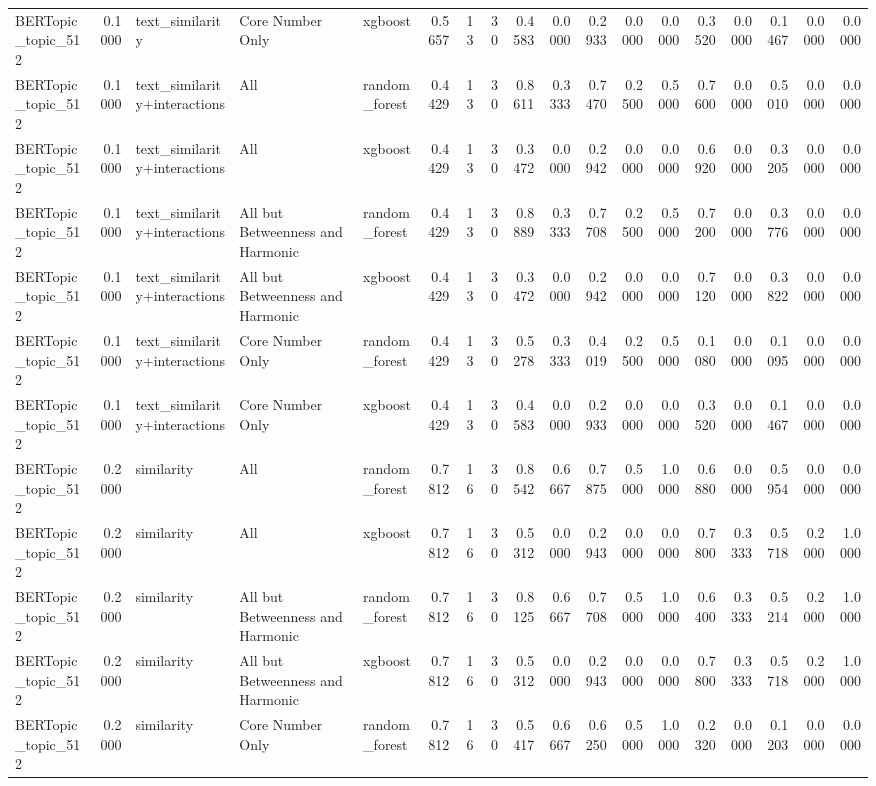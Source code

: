 \begin{tabular}{lrlllrrrrrrrrrrrrr}
BERTopic_topic_512 & 0.1000 & text_similarity & Core Number Only & xgboost & 0.5657 & 13 & 30 & 0.4583 & 0.0000 & 0.2933 & 0.0000 & 0.0000 & 0.3520 & 0.0000 & 0.1467 & 0.0000 & 0.0000 \\
BERTopic_topic_512 & 0.1000 & text_similarity+interactions & All & random_forest & 0.4429 & 13 & 30 & 0.8611 & 0.3333 & 0.7470 & 0.2500 & 0.5000 & 0.7600 & 0.0000 & 0.5010 & 0.0000 & 0.0000 \\
BERTopic_topic_512 & 0.1000 & text_similarity+interactions & All & xgboost & 0.4429 & 13 & 30 & 0.3472 & 0.0000 & 0.2942 & 0.0000 & 0.0000 & 0.6920 & 0.0000 & 0.3205 & 0.0000 & 0.0000 \\
BERTopic_topic_512 & 0.1000 & text_similarity+interactions & All but Betweenness and Harmonic & random_forest & 0.4429 & 13 & 30 & 0.8889 & 0.3333 & 0.7708 & 0.2500 & 0.5000 & 0.7200 & 0.0000 & 0.3776 & 0.0000 & 0.0000 \\
BERTopic_topic_512 & 0.1000 & text_similarity+interactions & All but Betweenness and Harmonic & xgboost & 0.4429 & 13 & 30 & 0.3472 & 0.0000 & 0.2942 & 0.0000 & 0.0000 & 0.7120 & 0.0000 & 0.3822 & 0.0000 & 0.0000 \\
BERTopic_topic_512 & 0.1000 & text_similarity+interactions & Core Number Only & random_forest & 0.4429 & 13 & 30 & 0.5278 & 0.3333 & 0.4019 & 0.2500 & 0.5000 & 0.1080 & 0.0000 & 0.1095 & 0.0000 & 0.0000 \\
BERTopic_topic_512 & 0.1000 & text_similarity+interactions & Core Number Only & xgboost & 0.4429 & 13 & 30 & 0.4583 & 0.0000 & 0.2933 & 0.0000 & 0.0000 & 0.3520 & 0.0000 & 0.1467 & 0.0000 & 0.0000 \\
BERTopic_topic_512 & 0.2000 & similarity & All & random_forest & 0.7812 & 16 & 30 & 0.8542 & 0.6667 & 0.7875 & 0.5000 & 1.0000 & 0.6880 & 0.0000 & 0.5954 & 0.0000 & 0.0000 \\
BERTopic_topic_512 & 0.2000 & similarity & All & xgboost & 0.7812 & 16 & 30 & 0.5312 & 0.0000 & 0.2943 & 0.0000 & 0.0000 & 0.7800 & 0.3333 & 0.5718 & 0.2000 & 1.0000 \\
BERTopic_topic_512 & 0.2000 & similarity & All but Betweenness and Harmonic & random_forest & 0.7812 & 16 & 30 & 0.8125 & 0.6667 & 0.7708 & 0.5000 & 1.0000 & 0.6400 & 0.3333 & 0.5214 & 0.2000 & 1.0000 \\
BERTopic_topic_512 & 0.2000 & similarity & All but Betweenness and Harmonic & xgboost & 0.7812 & 16 & 30 & 0.5312 & 0.0000 & 0.2943 & 0.0000 & 0.0000 & 0.7800 & 0.3333 & 0.5718 & 0.2000 & 1.0000 \\
BERTopic_topic_512 & 0.2000 & similarity & Core Number Only & random_forest & 0.7812 & 16 & 30 & 0.5417 & 0.6667 & 0.6250 & 0.5000 & 1.0000 & 0.2320 & 0.0000 & 0.1203 & 0.0000 & 0.0000 \\

\end{tabular}
